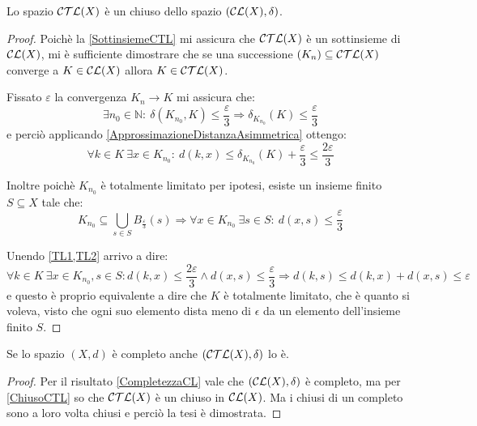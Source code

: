 \begin{lemma}\label{ChiusoCTL}
	Lo spazio $\mathcal{CTL}(X)$ è un chiuso dello spazio $(\mathcal{CL}(X),\delta)$.
\end{lemma}
\begin{proof}
	Poichè la \cref{SottinsiemeCTL} mi assicura che $\mathcal{CTL}(X)$ è un sottinsieme di $\mathcal{CL}(X)$, mi è sufficiente dimostrare che se una successione $(K_n) \subseteq \mathcal{CTL}(X)$ converge a $K\in\mathcal{CL}(X)$ allora $K\in\mathcal{CTL}(X)$.
	
	Fissato $\varepsilon$ la convergenza $K_n\to K$ mi assicura che:
	\begin{equation*}
		\exists n_0\in\mathbb{N}:\ \delta(K_{n_0},K)\le \frac{\varepsilon}3
		\Longrightarrow \delta_{K_{n_0}}(K)\le \frac{\varepsilon}3
	\end{equation*}
	e perciò applicando \cref{ApprossimazioneDistanzaAsimmetrica} ottengo:
	\begin{equation}\label{TL1}
		\forall k\in K\ \exists x\in K_{n_0}:
		\ d(k,x)\le \delta_{K_{n_0}}(K)+\frac{\varepsilon}3\le \frac{2\varepsilon}3
	\end{equation}
	
	Inoltre poichè $K_{n_0}$ è totalmente limitato per ipotesi, esiste un insieme finito $S \subseteq X$ tale che:
	\begin{equation}\label{TL2}
		K_{n_0}\subseteq \bigcup_{s\in S} B_{\frac{\varepsilon}3}(s)
		\Longrightarrow \forall x\in K_{n_0}\ \exists s\in S:\ d(x,s)\le \frac{\varepsilon}3
	\end{equation}
	
	Unendo \cref{TL1,TL2} arrivo a dire:
	\begin{equation}
		\forall k\in K\ \exists x\in K_{n_0},s\in S: d(k,x)\le \frac{2\varepsilon}3 \wedge d(x,s)\le \frac{\varepsilon}3
		\Longrightarrow d(k,s)\le d(k,x)+d(x,s) \le \varepsilon
	\end{equation}
	e questo è proprio equivalente a dire che $K$ è totalmente limitato, che è quanto si voleva, visto che ogni suo elemento dista meno di $\epsilon$ da un elemento dell'insieme finito $S$.
\end{proof}

\begin{corollary}\label{CompletezzaCTL}
	Se lo spazio $(X,d)$ è completo anche $(\mathcal{CTL}(X),\delta)$ lo è.
\end{corollary}
\begin{proof}
	Per il risultato \cref{CompletezzaCL} vale che $(\mathcal{CL}(X),\delta)$ è completo, ma per \cref{ChiusoCTL} so che $\mathcal{CTL}(X)$ è un chiuso in $\mathcal{CL}(X)$. Ma i chiusi di un completo sono a loro volta chiusi e perciò la tesi è dimostrata.
\end{proof}


